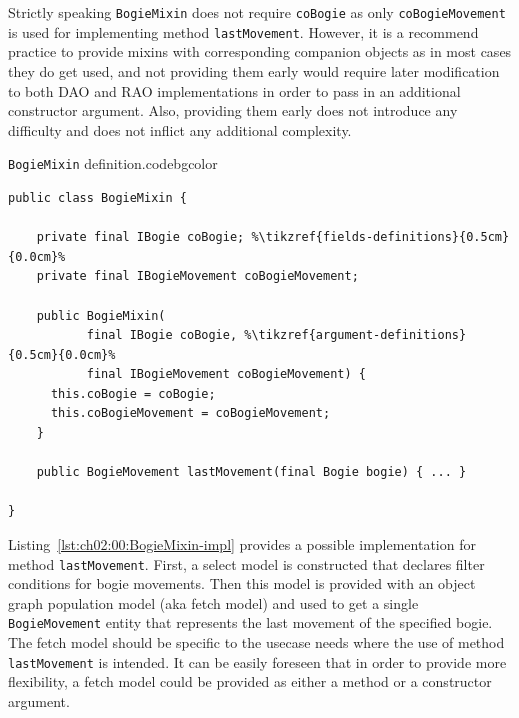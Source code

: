   Strictly speaking \texttt{BogieMixin} does not require \texttt{coBogie} as only \texttt{coBogieMovement} is used for implementing method \texttt{lastMovement}.
  However, it is a recommend practice to provide mixins with corresponding companion objects as in most cases they do get used, and not providing them early would require later modification to both DAO and RAO implementations in order to pass in an additional constructor argument.
  Also, providing them early does not introduce any difficulty and does not inflict any additional complexity.
  
    \begin{code}{\texttt{BogieMixin} definition.}{\label{lst:ch02:00:BogieMixin-def}}{codebgcolor}
    \begin{lstlisting}
public class BogieMixin {

    private final IBogie coBogie; %\tikzref{fields-definitions}{0.5cm}{0.0cm}%
    private final IBogieMovement coBogieMovement; 

    public BogieMixin(
           final IBogie coBogie, %\tikzref{argument-definitions}{0.5cm}{0.0cm}%
           final IBogieMovement coBogieMovement) {
      this.coBogie = coBogie;
      this.coBogieMovement = coBogieMovement;
    }
    
    public BogieMovement lastMovement(final Bogie bogie) { ... }
    
}
    \end{lstlisting}
  \end{code}
  
  Listing~\ref{lst:ch02:00:BogieMixin-impl} provides a possible implementation for method \texttt{lastMovement}.
  First, a select model is constructed that declares filter conditions for bogie movements.
  Then this model is provided with an object graph population model (aka fetch model) and used to get a single \texttt{BogieMovement} entity that represents the last movement of the specified bogie.
  The fetch model should be specific to the usecase needs where the use of method \texttt{lastMovement} is intended.
  It can be easily foreseen that in order to provide more flexibility, a fetch model could be provided as either a method or a constructor argument.
  
